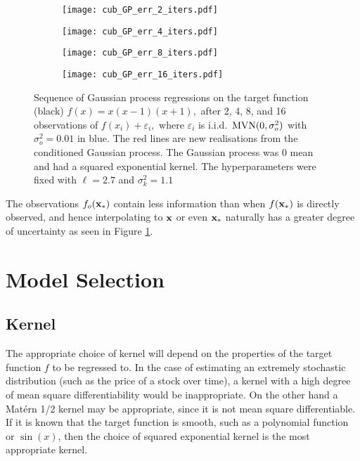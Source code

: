 \begin{figure}[htbp]
    \centering
    \begin{subfigure}[b]{0.5\textwidth}
        \centering
        \texttt{[image: cub\_GP\_err\_2\_iters.pdf]}
    \end{subfigure}%
    \hfill%
    \begin{subfigure}[b]{0.5\textwidth}
        \centering
        \texttt{[image: cub\_GP\_err\_4\_iters.pdf]}
    \end{subfigure}
    \begin{subfigure}[b]{0.5\textwidth}
        \centering
        \texttt{[image: cub\_GP\_err\_8\_iters.pdf]}
    \end{subfigure}%
    \hfill%
    \begin{subfigure}[b]{0.5\textwidth}
        \centering
        \texttt{[image: cub\_GP\_err\_16\_iters.pdf]}
    \end{subfigure}%
    \caption{
        Sequence of Gaussian process regressions on the target function
        (black) $f(x) = x(x-1)(x+1),$ after 2, 4, 8, and 16 observations of
        $f(x_i) + \varepsilon_i,$ where $\varepsilon_i$ is i.i.d.\
        $\operatorname{MVN}(0, \sigma^2_o)$ with $\sigma^2_o = 0.01$
        in blue. The red lines are new realisations from the conditioned
        Gaussian process. The Gaussian process was 0 mean and had a squared
        exponential kernel. The hyperparameters were fixed with $\ell = 2.7$
        and $\sigma^2_k = 1.1$
    }
    \label{fig:var_cub_reg}
\end{figure}

The observations $f_o(\mathbf{x}_*)$ contain less information than when $f(\mathbf{x}_*)$ 
is directly observed, and hence interpolating to $\mathbf{x}$ or even $\mathbf{x}_*$ 
naturally has a 
greater degree of uncertainty as seen in Figure \ref{fig:var_cub_reg}.

\section{Model Selection}

\subsection*{Kernel}

The appropriate choice of kernel will depend on the properties of the
target function $f$ to be regressed to. In the case of estimating an extremely
stochastic distribution (such as the price of a stock over time), a
kernel with a high degree of mean square differentiability would be 
inappropriate. On the other hand a Mat\'ern 1/2 kernel may be appropriate,
since it is not mean square differentiable. If it is known that the target
function is smooth, such as a polynomial function or $\sin(x)$, 
then the choice of squared
exponential kernel is the most appropriate kernel.

